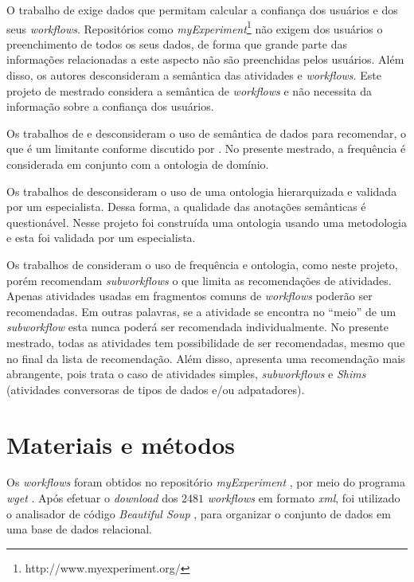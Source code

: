 \documentclass[10pt,letterpaper]{article}
\begin{document}
O trabalho de  exige dados que permitam calcular a confiança dos usuários e dos seus \emph{workflows}. Repositórios como \emph{myExperiment}\footnote{http://www.myexperiment.org/} não exigem dos usuários o preenchimento de todos os seus dados, de forma que grande parte das informações relacionadas a este aspecto não são preenchidas pelos usuários. Além disso, os autores desconsideram a semântica das atividades e \emph{workflows}. Este projeto de mestrado considera a semântica de \emph{workflows} e não necessita da informação sobre a confiança dos usuários.

Os trabalhos de  e  desconsideram o uso de semântica de dados para recomendar, o que é um limitante conforme discutido por . No presente mestrado, a frequência é considerada em conjunto com a ontologia de domínio.

Os trabalhos de  desconsideram o uso de uma ontologia hierarquizada e validada por um especialista. Dessa forma, a qualidade das anotações semânticas é questionável. Nesse projeto foi construída uma ontologia usando uma metodologia e esta foi validada por um especialista.

Os trabalhos de  consideram o uso de frequência e ontologia, como neste projeto, porém recomendam \emph{subworkflows} o que limita as recomendações de atividades. Apenas atividades usadas em fragmentos comuns de \emph{workflows} poderão ser recomendadas. Em outras palavras, se a atividade se encontra no ``meio'' de um \emph{subworkflow} esta nunca poderá ser recomendada individualmente. No presente mestrado, todas as atividades tem possibilidade de ser recomendadas, mesmo que no final da lista de recomendação. Além disso, apresenta uma recomendação mais abrangente, pois trata o caso de atividades simples, \emph{subworkflows} e \emph{Shims} (atividades conversoras de tipos de dados e/ou adpatadores).

\section*{Materiais e métodos} \label{mat_met}
Os \emph{workflows} foram obtidos no repositório \emph{myExperiment} \cite{ROURE2015}, por meio do programa \emph{wget} \cite{wget2015}. Após efetuar o \emph{download} dos \(2481\) \emph{workflows} em formato \emph{xml}, foi utilizado o analisador de código \emph{Beautiful Soup} \cite{BeautifulSoup2015}, para organizar o conjunto de dados em uma base de dados relacional.
\end{document}
